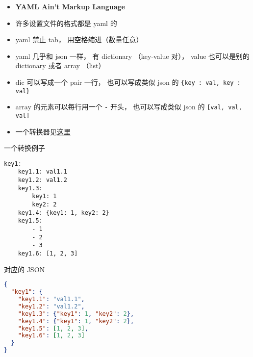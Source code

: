 
\begin{issues}
\issueDraft
\end{issues}


\begin{itemize}
\item \textbf{YAML Ain't Markup Language}
\item 许多设置文件的格式都是 yaml 的
\item yaml 禁止 tab， 用空格缩进（数量任意）
\item yaml 几乎和 json 一样， 有 dictionary （key-value 对）， value 也可以是别的 dictionary 或者 array （list）
\item dic 可以写成一个 pair 一行， 也可以写成类似 json 的 \verb|{key : val, key : val}|
\item array 的元素可以每行用一个 \verb|-| 开头， 也可以写成类似 json 的 \verb|[val, val, val]|
\item 一个转换器见\href{https://onlineyamltools.com/convert-yaml-to-json}{这里}
\end{itemize}

一个转换例子
\begin{lstlisting}[language=none]
key1:
    key1.1: val1.1
    key1.2: val1.2
    key1.3:
        key1: 1
        key2: 2
    key1.4: {key1: 1, key2: 2}
    key1.5:
        - 1
        - 2
        - 3
    key1.6: [1, 2, 3]
\end{lstlisting}
对应的 JSON
\begin{lstlisting}[language=json]
{
  "key1": {
    "key1.1": "val1.1",
    "key1.2": "val1.2",
    "key1.3": {"key1": 1, "key2": 2},
    "key1.4": {"key1": 1, "key2": 2},
    "key1.5": [1, 2, 3],
    "key1.6": [1, 2, 3]
  }
}
\end{lstlisting}
